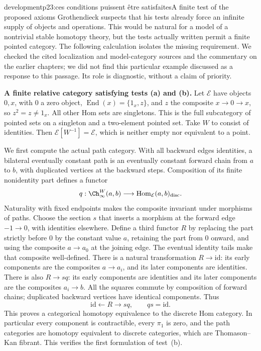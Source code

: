 \begin{dcomment}{development}{p23:ces conditions puissent être satisfaites}{A finite test of the proposed axioms}
Grothendieck suspects that his tests already force an infinite supply of objects and operations. This would be natural for a model of a nontrivial stable homotopy theory, but the tests actually written permit a finite pointed category. The following calculation isolates the missing requirement. We checked the cited localization and model-category sources and the commentary on the earlier chapters; we did not find this particular example discussed as a response to this passage. Its role is diagnostic, without a claim of priority.

\textbf{A finite relative category satisfying tests (a) and (b).}\ours
Let $\mathcal E$ have objects $0,x$, with $0$ a zero object, $\operatorname{End}(x)=\{1_x,z\}$, and $z$ the composite $x\to0\to x$, so $z^2=z\ne1_x$. All other Hom sets are singletons. This is the full subcategory of pointed sets on a singleton and a two-element pointed set. Take $W$ to consist of identities. Then $\mathcal E[W^{-1}]=\mathcal E$, which is neither empty nor equivalent to a point.

We first compute the actual path category. With all backward edges identities, a bilateral eventually constant path is an eventually constant forward chain from $a$ to $b$, with duplicated vertices at the backward steps. Composition of its finite nonidentity part defines a functor
\[
 q:\Ch_\infty^W(a,b)\longrightarrow
       \operatorname{Hom}_{\mathcal E}(a,b)_{\mathrm{disc}}.
\]
Naturality with fixed endpoints makes the composite invariant under morphisms of paths. Choose the section $s$ that inserts a morphism at the forward edge $-1\to0$, with identities elsewhere. Define a third functor $R$ by replacing the part strictly before $0$ by the constant value $a$, retaining the part from $0$ onward, and using the composite $a\to a_0$ at the joining edge. The eventual identity tails make that composite well-defined. There is a natural transformation $R\to\mathrm{id}$: its early components are the composites $a\to a_i$, and its later components are identities. There is also $R\to sq$: its early components are identities and its later components are the composites $a_i\to b$. All the squares commute by composition of forward chains; duplicated backward vertices have identical components. Thus
\[
 \mathrm{id}\longleftarrow R\longrightarrow sq,
 \qquad qs=\mathrm{id}.
\]
This proves a categorical homotopy equivalence to the discrete Hom category. In particular every component is contractible, every $\pi_1$ is zero, and the path categories are homotopy equivalent to discrete categories, which are Thomason--Kan fibrant. This verifies the first formulation of test~(b).


\end{dcomment}
